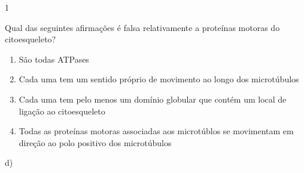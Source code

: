 \documentclass[\mainfilename]{subfiles}
\begin{document}
\begin{questionBox}1{} %

    Qual das seguintes afirmações é falsa relativamente a proteínas motoras do citoesqueleto?

    \begin{enumerate}[label=\alph{enumi})]
            \item São todas ATPases
            \item Cada uma tem um sentido próprio de movimento ao longo dos microtúbulos
            \item Cada uma tem pelo menos um domínio globular que contém um local de ligação ao citoesqueleto
            \item Todas as proteínas motoras associadas aos microtúblos se movimentam em direção ao polo positivo dos microtúbulos        
    \end{enumerate}

    \begin{answerBox}{} %
        d)
    \end{answerBox}

\end{questionBox}
\end{document}
